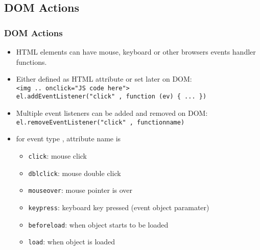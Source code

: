 \documentclass[trans,compress,xcolor=table]{beamer}
\begin{document}
\subsection*{DOM Actions}
\begin{frame}[fragile]
\frametitle{DOM Actions}
\begin{itemize}
\item HTML elements can have mouse, keyboard or other
browsers events handler functions.
\item Either defined as HTML attribute or set later on DOM:\\
	\lstinline!<img .. onclick="JS code here">!\\
	\lstinline!el.addEventListener("click" , function (ev) { ... })!
\item Multiple event listeners can be added and removed on DOM:\\
	\lstinline!el.removeEventListener("click" , functionname)!
\item for event type , attribute name is 
\begin{itemize}
\item \lstinline!click!: mouse click
\item \lstinline!dblclick!: mouse double click
\item \lstinline!mouseover!: mouse pointer is over
\item \lstinline!keypress!: keyboard key pressed (event object paramater)
\item \lstinline!beforeload!: when object starts to be loaded
\item \lstinline!load!: when object is loaded
\end{itemize}
\end{itemize}
\end{frame}
\end{document}
